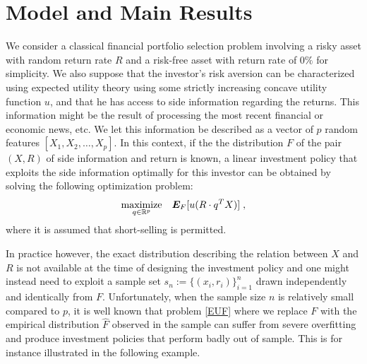 \section{Model and Main Results}
\newcommand{\Prob}{P}
\newcommand{\F}{F}
\newcommand{\Fhat}{{\hat{\F}}}
\newcommand{\qhat}{{\hat{q}}}
\newcommand{\Sx}{{\mathcal{S}_X}}
\newcommand{\Sr}{{\mathcal{S}_R}}
\newcommand{\Sn}{s_n}
\newcommand{\urange}{u_{\mbox{\footnotesize range}}}
\newcommand{\qhatOp}{{\bold{\qhat}}}







We consider a classical financial portfolio selection problem involving a risky asset with
random return rate $R$ and a risk-free asset with return rate of $0\%$ for simplicity. We
also suppose that the investor's risk aversion can be characterized using expected utility
theory using some strictly increasing concave utility function $u$, and that he has access
to side information regarding the returns. This information might be the result of
processing the most recent financial or economic news, etc. We let this information be
described as a vector of $p$ random features $[X_1,X_2,\dots,X_p]$. In this context, if
the the distribution $\F$ of the pair $(X,R)$ of side information and return is known, a
linear investment policy that exploits the side information optimally for this investor
can be obtained by solving the following optimization problem:
\begin{equation}
\maximize_{q\in\Re^p}\;\;\;\E_\F[u(R\cdot q^TX)]\;,\label{EUF}
\end{equation}
where it is assumed that short-selling is permitted. 

In practice however, the exact distribution describing the relation between $X$ and $R$ is
not available at the time of designing the investment policy and one might instead need to
exploit a sample set $\Sn:=\{(x_i,r_i)\}_{i=1}^n$ drawn independently and identically from
$\F$. Unfortunately, when the sample size $n$ is relatively small compared to $p$, it is
well known that problem \eqref{EUF} where we replace $\F$ with the empirical distribution
$\Fhat$ observed in the sample can suffer from severe overfitting  and produce investment policies that perform badly out of sample. This is for
instance illustrated in the following example.

